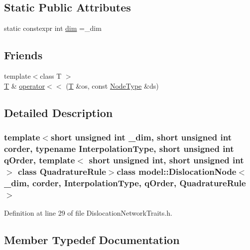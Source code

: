 \subsection*{Static Public Attributes}
\begin{DoxyCompactItemize}
\item 
static constexpr int \hyperlink{classmodel_1_1_dislocation_node_abba8c89236dd4715f60c798aa12873eb}{dim} =\+\_\+dim
\end{DoxyCompactItemize}
\subsection*{Friends}
\begin{DoxyCompactItemize}
\item 
{\footnotesize template$<$class T $>$ }\\\hyperlink{_spline_node_base__corder1_8h_a82692d3a5502b91460591f1d5504314a}{T} \& \hyperlink{classmodel_1_1_dislocation_node_a8e851fe1c99fc240176e048515c8b8da}{operator$<$$<$} (\hyperlink{_spline_node_base__corder1_8h_a82692d3a5502b91460591f1d5504314a}{T} \&os, const \hyperlink{_network_typedefs_8h_a723f680c66f6a92647827790bcbafce0}{Node\+Type} \&ds)
\end{DoxyCompactItemize}


\subsection{Detailed Description}
\subsubsection*{template$<$short unsigned int \+\_\+dim, short unsigned int corder, typename Interpolation\+Type, short unsigned int q\+Order, template$<$ short unsigned int, short unsigned int $>$ class Quadrature\+Rule$>$class model\+::\+Dislocation\+Node$<$ \+\_\+dim, corder, Interpolation\+Type, q\+Order, Quadrature\+Rule $>$}



Definition at line 29 of file Dislocation\+Network\+Traits.\+h.



\subsection{Member Typedef Documentation}
\hypertarget{classmodel_1_1_dislocation_node_a8897d6a9187952a267bb5a539dd69beb}{}

